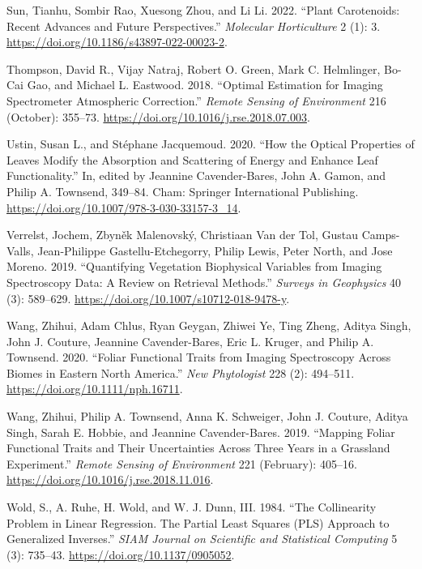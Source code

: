\documentclass[
  letterpaper,
  DIV=11,
  numbers=noendperiod]{scrartcl}
\newlength{\cslhangindent}
\newlength{\cslentryspacingunit} %
\newenvironment{CSLReferences}[2] %
 {%
  \setlength{\parindent}{0pt}
  \ifodd #1
  \let\oldpar\par
  \def\par{\hangindent=\cslhangindent\oldpar}
  \fi
  \setlength{\parskip}{#2\cslentryspacingunit}
 }%
 {}
\begin{document}
\begin{CSLReferences}{1}{0}
\leavevmode{}%
Sun, Tianhu, Sombir Rao, Xuesong Zhou, and Li Li. 2022. {``Plant
Carotenoids: Recent Advances and Future Perspectives.''} \emph{Molecular
Horticulture} 2 (1): 3.
\url{https://doi.org/10.1186/s43897-022-00023-2}.

\leavevmode{}%
Thompson, David R., Vijay Natraj, Robert O. Green, Mark C. Helmlinger,
Bo-Cai Gao, and Michael L. Eastwood. 2018. {``Optimal Estimation for
Imaging Spectrometer Atmospheric Correction.''} \emph{Remote Sensing of
Environment} 216 (October): 355--73.
\url{https://doi.org/10.1016/j.rse.2018.07.003}.

\leavevmode{}%
Ustin, Susan L., and Stéphane Jacquemoud. 2020. {``How the Optical
Properties of Leaves Modify the Absorption and Scattering of Energy and
Enhance Leaf Functionality.''} In, edited by Jeannine Cavender-Bares,
John A. Gamon, and Philip A. Townsend, 349--84. Cham: Springer
International Publishing.
\url{https://doi.org/10.1007/978-3-030-33157-3_14}.

\leavevmode{}%
Verrelst, Jochem, Zbyněk Malenovský, Christiaan Van der Tol, Gustau
Camps-Valls, Jean-Philippe Gastellu-Etchegorry, Philip Lewis, Peter
North, and Jose Moreno. 2019. {``Quantifying Vegetation Biophysical
Variables from Imaging Spectroscopy Data: A Review on Retrieval
Methods.''} \emph{Surveys in Geophysics} 40 (3): 589--629.
\url{https://doi.org/10.1007/s10712-018-9478-y}.

\leavevmode{}%
Wang, Zhihui, Adam Chlus, Ryan Geygan, Zhiwei Ye, Ting Zheng, Aditya
Singh, John J. Couture, Jeannine Cavender-Bares, Eric L. Kruger, and
Philip A. Townsend. 2020. {``Foliar Functional Traits from Imaging
Spectroscopy Across Biomes in Eastern North America.''} \emph{New
Phytologist} 228 (2): 494--511. \url{https://doi.org/10.1111/nph.16711}.

\leavevmode{}%
Wang, Zhihui, Philip A. Townsend, Anna K. Schweiger, John J. Couture,
Aditya Singh, Sarah E. Hobbie, and Jeannine Cavender-Bares. 2019.
{``Mapping Foliar Functional Traits and Their Uncertainties Across Three
Years in a Grassland Experiment.''} \emph{Remote Sensing of Environment}
221 (February): 405--16.
\url{https://doi.org/10.1016/j.rse.2018.11.016}.

\leavevmode{}%
Wold, S., A. Ruhe, H. Wold, and W. J. Dunn, III. 1984. {``The
Collinearity Problem in Linear Regression. The Partial Least Squares
(PLS) Approach to Generalized Inverses.''} \emph{SIAM Journal on
Scientific and Statistical Computing} 5 (3): 735--43.
\url{https://doi.org/10.1137/0905052}.


\end{CSLReferences}
\end{document}
